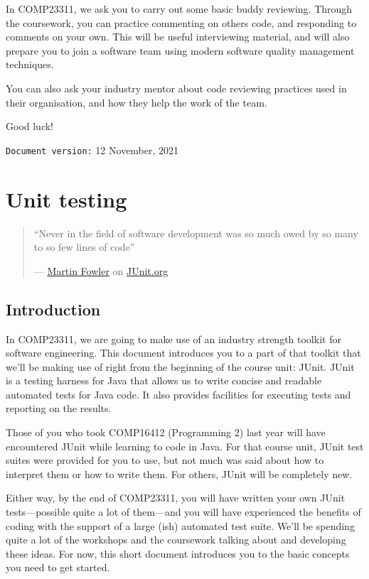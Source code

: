 \documentclass[
]{book}
\begin{document}
In COMP23311, we ask you to carry out some basic buddy reviewing. Through the coursework, you can practice commenting on others code, and responding to comments on your own. This will be useful interviewing material, and will also prepare you to join a software team using modern software quality management techniques.

You can also ask your industry mentor about code reviewing practices used in their organisation, and how they help the work of the team.

Good luck!

\texttt{Document\ version:} 12 November, 2021

\hypertarget{automating}{%
\chapter{Unit testing}\label{automating}}

\begin{quote}
``Never in the field of software development was so much owed by so many to so few lines of code''

--- \href{https://en.wikipedia.org/wiki/Martin_Fowler_(software_engineer)}{Martin Fowler} on \href{https://junit.org/}{JUnit.org}
\end{quote}

\hypertarget{jintro}{%
\section{Introduction}\label{jintro}}

In COMP23311, we are going to make use of an industry strength toolkit for software engineering. This document introduces you to a part of that toolkit that we'll be making use of right from the beginning of the course unit: JUnit. JUnit is a testing harness for Java that allows us to write concise and readable automated tests for Java code. It also provides facilities for executing tests and reporting on the results.

Those of you who took COMP16412 (Programming 2) last year will have encountered JUnit while learning to code in Java. For that course unit, JUnit test suites were provided for you to use, but not much was said about how to interpret them or how to write them. For others, JUnit will be completely new.

Either way, by the end of COMP23311, you will have written your own JUnit tests---possible quite a lot of them---and you will have experienced the benefits of coding with the support of a large (ish) automated test suite. We'll be spending quite a lot of the workshops and the coursework talking about and developing these ideas. For now, this short document introduces you to the basic concepts you need to get started.
\end{document}
